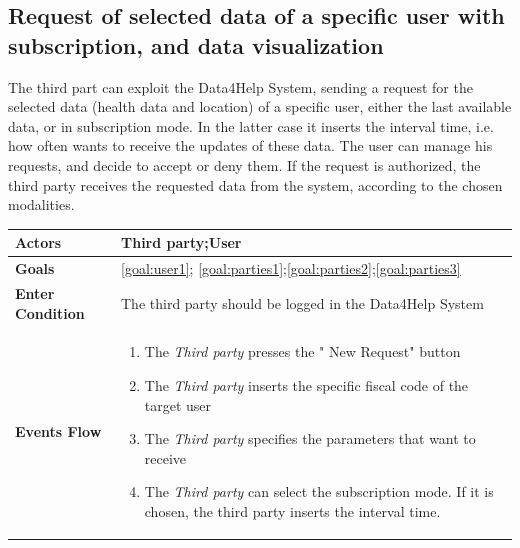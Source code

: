  \subsection{Request of selected data of a specific user with subscription, and data visualization}
 
The third part can exploit the Data4Help System, sending a request for the selected data (health data and location) of a specific user, either the last available data, or in subscription mode.  
 In the latter case  it inserts the interval time, i.e. how often wants to receive the updates of these data.
The user can manage his requests, and decide to accept or deny them. If the request is authorized, the third party receives the requested data from the system, according to the chosen modalities.

\begin{table}[H]
	\centering
    
    \begin{tabular}{|p{3.5cm}|p{10.3cm}|}
    
    \hline
    \textbf{\large{Actors}}  			& \tabitem Third party;\tabitem  User  									\\
    				 			
    \hline
    \textbf{\large{Goals}} 				&\ref{goal:user1}; \ref{goal:parties1};\ref{goal:parties2};\ref{goal:parties3}\\
    
    \hline
    \textbf{\large{Enter Condition}} & The third party should be logged in the Data4Help System	\\
    
    \hline
    \textbf{\large{Events Flow}}		& \begin{enumerate}[leftmargin=0.5cm]
                                          	\item The \emph{Third party}  presses the " New Request" button
                                            \item The \emph{Third party} inserts the specific fiscal code of the target user
                                            \item The \emph{Third party} specifies the parameters that want to receive
                                            
                                            \item The \emph{Third party} can select the subscription mode. If 
                            it is chosen, the third party inserts the interval time. 
                            

\end{enumerate}
\end{tabular}
\end{table}
